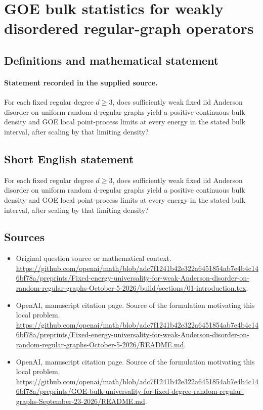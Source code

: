 \documentclass[11pt]{article}
\begin{document}
\section*{GOE bulk statistics for weakly disordered regular-graph operators}\label{statement}
\subsection{Definitions and mathematical statement}
\paragraph{Statement recorded in the supplied source.}
For each fixed regular degree $d\geq 3$, does sufficiently weak fixed iid Anderson disorder on uniform random d-regular graphs yield a positive continuous bulk density and GOE local point-process limits at every energy in the stated bulk interval, after scaling by that limiting density?
\subsection{Short English statement}
For each fixed regular degree $d\geq 3$, does sufficiently weak fixed iid Anderson disorder on uniform random d-regular graphs yield a positive continuous bulk density and GOE local point-process limits at every energy in the stated bulk interval, after scaling by that limiting density?
\subsection{Sources}
\begin{itemize}
\item[S1] Original question source or mathematical context.
\url{https://github.com/openai/math/blob/adc7f1241b42e322a6451854ab7e4b4c146bf78a/preprints/Fixed-energy-universality-for-weak-Anderson-disorder-on-random-regular-graphs-October-5-2026/build/sections/01-introduction.tex}.
\item[S2] OpenAI, manuscript citation page. Source of the formulation motivating this local problem.
\url{https://github.com/openai/math/blob/adc7f1241b42e322a6451854ab7e4b4c146bf78a/preprints/Fixed-energy-universality-for-weak-Anderson-disorder-on-random-regular-graphs-October-5-2026/README.md}.
\item[S3] OpenAI, manuscript citation page. Source of the formulation motivating this local problem.
\url{https://github.com/openai/math/blob/adc7f1241b42e322a6451854ab7e4b4c146bf78a/preprints/GOE-bulk-universality-for-fixed-degree-random-regular-graphs-September-23-2026/README.md}.
\end{itemize}
\end{document}
